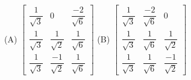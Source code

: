 \documentclass{article}
\begin{document}
																																																																																																																																	  (A) $\begin{bmatrix}
																																																																																																																																	      \dfrac{1}{\sqrt{3}} & 0 & \dfrac{-2}{\sqrt{6}} \\
																																																																																																																																	          \dfrac{1}{\sqrt{3}} & \dfrac{1}{\sqrt{2}} & \dfrac{1}{\sqrt{6}} \\
																																																																																																																																		      \dfrac{1}{\sqrt{3}} & \dfrac{-1}{\sqrt{2}} & \dfrac{1}{\sqrt{6}}
																																																																																																																																		          \end{bmatrix}$ \hspace{2cm} (B) $\begin{bmatrix}
																																																																																																																																			      \dfrac{1}{\sqrt{3}} & \dfrac{-2}{\sqrt{6}} & 0 \\
																																																																																																																																			          \dfrac{1}{\sqrt{3}} & \dfrac{1}{\sqrt{6}} & \dfrac{1}{\sqrt{2}} \\
																																																																																																																																				      \dfrac{1}{\sqrt{3}} & \dfrac{1}{\sqrt{6}} & \dfrac{-1}{\sqrt{2}}
																																																																																																																																				          \end{bmatrix}$
\end{document}
